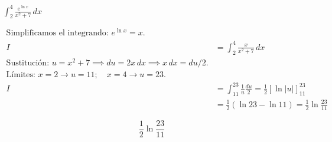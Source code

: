 $\displaystyle \int_{2}^{4}\frac{e^{\ln x}}{x^2+7}\,dx$

\nopagebreak
\begin{align*}
\text{Simplificamos el integrando: } e^{\ln x} = x. \\
I &= \int_{2}^{4} \frac{x}{x^2+7} \, dx \\
\text{Sustitución: } u = x^2+7 \implies du = 2x \, dx \implies x \, dx = du/2. \\
\text{Límites: } x=2 \to u=11; \quad x=4 \to u=23. \\
I &= \int_{11}^{23} \frac{1}{u} \frac{du}{2} = \frac{1}{2} [\ln|u|]_{11}^{23} \\
&= \frac{1}{2} (\ln 23 - \ln 11) = \frac{1}{2} \ln \frac{23}{11}
\end{align*}

\[
\boxed{\displaystyle \frac{1}{2} \ln \frac{23}{11}}
\]
